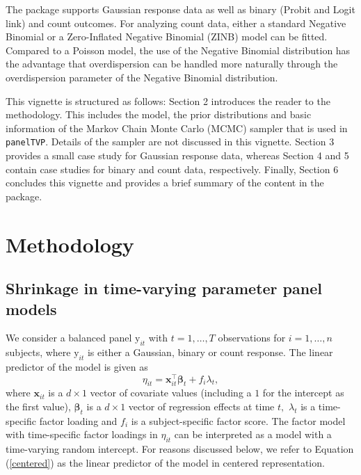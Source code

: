 \documentclass[a4paper, preprint, 3p,
authoryear]{elsarticle} %
\begin{document}
The package supports Gaussian response data as well as binary (Probit
and Logit link) and count outcomes. For analyzing count data, either a
standard Negative Binomial or a Zero-Inflated Negative Binomial (ZINB)
model can be fitted. Compared to a Poisson model, the use of the
Negative Binomial distribution has the advantage that overdispersion can
be handled more naturally through the overdispersion parameter of the
Negative Binomial distribution.

This vignette is structured as follows: Section 2 introduces the reader
to the methodology. This includes the model, the prior distributions and
basic information of the Markov Chain Monte Carlo (MCMC) sampler that is
used in \texttt{panelTVP}. Details of the sampler are not discussed in
this vignette. Section 3 provides a small case study for Gaussian
response data, whereas Section 4 and 5 contain case studies for binary
and count data, respectively. Finally, Section 6 concludes this vignette
and provides a brief summary of the content in the package.

\section{Methodology}\label{methodology}

\subsection{Shrinkage in time-varying parameter panel
models}\label{shrinkage-in-time-varying-parameter-panel-models}

We consider a balanced panel \(\text{y}_{it}\) with \(t = 1,\dots,T\)
observations for \(i = 1,\dots,n\) subjects, where \(\text{y}_{it}\) is
either a Gaussian, binary or count response. The linear predictor of the
model is given as \begin{equation}
\label{centered}
    \eta_{it} = \textbf{x}_{it}^\top \boldsymbol{\beta}_t + f_i\lambda_t,
\end{equation} where \(\textbf{x}_{it}\) is a \(d \times 1\) vector of
covariate values (including a \(1\) for the intercept as the first
value), \(\boldsymbol{\beta}_t\) is a \(d \times 1\) vector of
regression effects at time \(t,\) \(\lambda_t\) is a time-specific
factor loading and \(f_i\) is a subject-specific factor score. The
factor model with time-specific factor loadings in \(\eta_{it}\) can be
interpreted as a model with a time-varying random intercept. For reasons
discussed below, we refer to Equation (\ref{centered}) as the linear
predictor of the model in centered representation.
\end{document}
